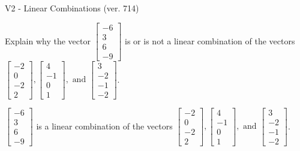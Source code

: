 \begin{exercise}
  \begin{exerciseTitle}V2 - Linear Combinations (ver. 714)\end{exerciseTitle}
  \begin{exerciseStatement}
    Explain why the vector \(\left[\begin{array}{c}
-6 \\
3 \\
6 \\
-9
\end{array}\right]\)  is or is not a linear 
	combination of the vectors \(\left[\begin{array}{c}
-2 \\
0 \\
-2 \\
2
\end{array}\right] , \left[\begin{array}{c}
4 \\
-1 \\
0 \\
1
\end{array}\right] , \text{ and } \left[\begin{array}{c}
3 \\
-2 \\
-1 \\
-2
\end{array}\right]\).
	


  \end{exerciseStatement}
  \begin{exerciseAnswer}
   \(\left[\begin{array}{c}
-6 \\
3 \\
6 \\
-9
\end{array}\right]\) 
  	 is  
	a linear combination of the vectors \(\left[\begin{array}{c}
-2 \\
0 \\
-2 \\
2
\end{array}\right] , \left[\begin{array}{c}
4 \\
-1 \\
0 \\
1
\end{array}\right] , \text{ and } \left[\begin{array}{c}
3 \\
-2 \\
-1 \\
-2
\end{array}\right]\).

	
  


  \end{exerciseAnswer}
\end{exercise}